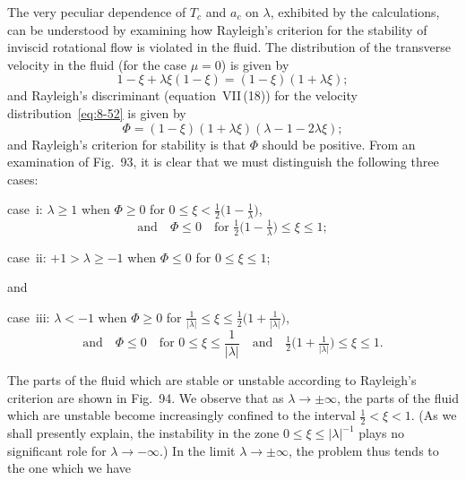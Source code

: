 The very peculiar dependence of $T_c$ and $a_c$ on $\lambda$, exhibited by the calculations, can be understood by examining how Rayleigh's criterion for the stability of inviscid rotational flow is violated in the fluid. The distribution of the transverse velocity in the fluid (for the case $\mu = 0$) is given by
\begin{equation}
\label{eq:8-52}
1 - \xi + \lambda\xi(1-\xi) = (1-\xi)(1+\lambda\xi);
\end{equation}
and Rayleigh's discriminant (equation~VII\,(18)) for the velocity distribution~\eqref{eq:8-52} is given by
\begin{equation}
\label{eq:8-53}
\Phi = (1-\xi)(1+\lambda\xi)(\lambda - 1 - 2\lambda\xi);
\end{equation}
and Rayleigh's criterion for stability is that $\Phi$ should be positive. From an examination of Fig.~93, it is clear that we must distinguish the following three cases:

\medskip
\noindent case~i: \quad $\lambda \geqslant 1$ when $\Phi \geqslant 0$ for $0 \leqslant \xi < \tfrac{1}{2}\bigl(1-\tfrac{1}{\lambda}\bigr)$,
\begin{equation}
\label{eq:8-54}
\text{and}\quad \Phi \leqslant 0\quad \text{for } \tfrac{1}{2}\bigl(1-\tfrac{1}{\lambda}\bigr) \leqslant \xi \leqslant 1;
\end{equation}

\noindent case~ii: \quad $+1 > \lambda \geqslant -1$ when $\Phi \leqslant 0$ for $0 \leqslant \xi \leqslant 1$;
\begin{equation}
\label{eq:8-55}
\end{equation}

\noindent and

\noindent case~iii: \quad $\lambda < -1$ when $\Phi \geqslant 0$ for $\frac{1}{|\lambda|} \leqslant \xi \leqslant \tfrac{1}{2}\bigl(1+\tfrac{1}{|\lambda|}\bigr)$,
\begin{equation}
\label{eq:8-56}
\text{and}\quad \Phi \leqslant 0\quad \text{for } 0 \leqslant \xi \leqslant \frac{1}{|\lambda|} \quad\text{and}\quad \tfrac{1}{2}\bigl(1+\tfrac{1}{|\lambda|}\bigr) \leqslant \xi \leqslant 1.
\end{equation}

The parts of the fluid which are stable or unstable according to Rayleigh's criterion are shown in Fig.~94. We observe that as $\lambda \to \pm\infty$, the parts of the fluid which are unstable become increasingly confined to the interval $\tfrac{1}{2} < \xi < 1$. (As we shall presently explain, the instability in the zone $0 \leqslant \xi \leqslant |\lambda|^{-1}$ plays no significant role for $\lambda \to -\infty$.) In the limit $\lambda\to\pm\infty$, the problem thus tends to the one which we have

